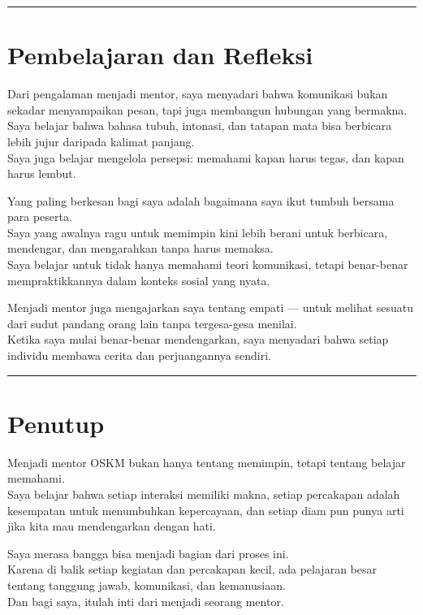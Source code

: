 \documentclass[
  letterpaper,
  DIV=11,
  numbers=noendperiod]{scrreprt}
\begin{document}
\begin{center}\rule{0.5\linewidth}{0.5pt}\end{center}

\section{Pembelajaran dan Refleksi}\label{pembelajaran-dan-refleksi}

Dari pengalaman menjadi mentor, saya menyadari bahwa komunikasi bukan
sekadar menyampaikan pesan, tapi juga membangun hubungan yang
bermakna.\\
Saya belajar bahwa bahasa tubuh, intonasi, dan tatapan mata bisa
berbicara lebih jujur daripada kalimat panjang.\\
Saya juga belajar mengelola persepsi: memahami kapan harus tegas, dan
kapan harus lembut.

Yang paling berkesan bagi saya adalah bagaimana saya ikut tumbuh bersama
para peserta.\\
Saya yang awalnya ragu untuk memimpin kini lebih berani untuk berbicara,
mendengar, dan mengarahkan tanpa harus memaksa.\\
Saya belajar untuk tidak hanya memahami teori komunikasi, tetapi
benar-benar mempraktikkannya dalam konteks sosial yang nyata.

Menjadi mentor juga mengajarkan saya tentang empati --- untuk melihat
sesuatu dari sudut pandang orang lain tanpa tergesa-gesa menilai.\\
Ketika saya mulai benar-benar mendengarkan, saya menyadari bahwa setiap
individu membawa cerita dan perjuangannya sendiri.

\begin{center}\rule{0.5\linewidth}{0.5pt}\end{center}

\section{Penutup}\label{penutup}

Menjadi mentor OSKM bukan hanya tentang memimpin, tetapi tentang belajar
memahami.\\
Saya belajar bahwa setiap interaksi memiliki makna, setiap percakapan
adalah kesempatan untuk menumbuhkan kepercayaan, dan setiap diam pun
punya arti jika kita mau mendengarkan dengan hati.

Saya merasa bangga bisa menjadi bagian dari proses ini.\\
Karena di balik setiap kegiatan dan percakapan kecil, ada pelajaran
besar tentang tanggung jawab, komunikasi, dan kemanusiaan.\\
Dan bagi saya, itulah inti dari menjadi seorang mentor.
\end{document}
